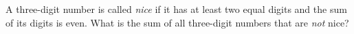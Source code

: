 A three-digit number is called \emph{nice} if it has at least two equal digits and the sum of its digits is even. What is the sum of all three-digit numbers that are \emph{not} nice?
